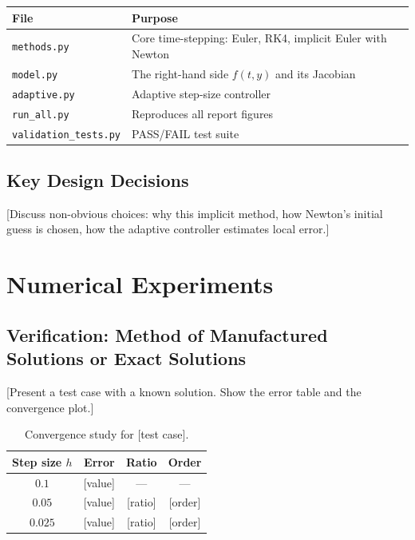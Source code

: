 \documentclass[11pt,a4paper]{article}
\theoremstyle{definition}
\theoremstyle{remark}
\begin{document}
\begin{table}[H]
\centering
\begin{tabular}{ll}
\toprule
\textbf{File} & \textbf{Purpose} \\
\midrule
\texttt{methods.py} & Core time-stepping: Euler, RK4, implicit Euler with Newton \\
\texttt{model.py} & The right-hand side $f(t,y)$ and its Jacobian \\
\texttt{adaptive.py} & Adaptive step-size controller \\
\texttt{run\_all.py} & Reproduces all report figures \\
\texttt{validation\_tests.py} & PASS/FAIL test suite \\
\bottomrule
\end{tabular}
\end{table}

\subsection{Key Design Decisions}
[Discuss non-obvious choices: why this implicit method, how Newton's initial
guess is chosen, how the adaptive controller estimates local error.]

\newpage
\section{Numerical Experiments}

\subsection{Verification: Method of Manufactured Solutions or Exact Solutions}
[Present a test case with a known solution. Show the error table and the
convergence plot.]

\begin{table}[H]
\centering
\begin{tabular}{cccc}
\toprule
\textbf{Step size $h$} & \textbf{Error} & \textbf{Ratio} & \textbf{Order} \\
\midrule
$0.1$    & [value] & ---  & ---  \\
$0.05$   & [value] & [ratio] & [order] \\
$0.025$  & [value] & [ratio] & [order] \\
\bottomrule
\end{tabular}
\caption{Convergence study for [test case].}
\end{table}
\end{document}
